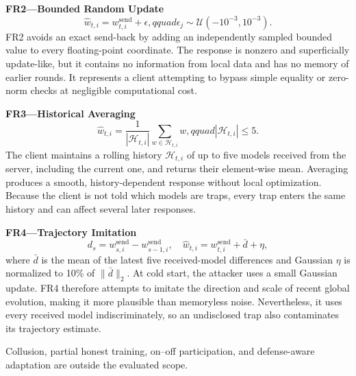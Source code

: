 \documentclass[conference]{IEEEtran}
\begin{document}
\medskip\noindent\textbf{FR2---Bounded Random Update}
\begin{equation}
\widehat w_{t,i}=w^{\mathrm{send}}_{t,i}+\epsilon,qquad
\epsilon_j\sim\mathcal U(-10^{-3},10^{-3}).
\end{equation}
FR2 avoids an exact send-back by adding an independently sampled bounded value to every floating-point coordinate. The response is nonzero and superficially update-like, but it contains no information from local data and has no memory of earlier rounds. It represents a client attempting to bypass simple equality or zero-norm checks at negligible computational cost.

\medskip\noindent\textbf{FR3---Historical Averaging}
\begin{equation}
\widehat w_{t,i}=\frac{1}{|\mathcal H_{t,i}|}
\sum_{w\in\mathcal H_{t,i}}w,qquad |\mathcal H_{t,i}|\leq5.
\end{equation}
The client maintains a rolling history $\mathcal H_{t,i}$ of up to five models received from the server, including the current one, and returns their element-wise mean. Averaging produces a smooth, history-dependent response without local optimization. Because the client is not told which models are traps, every trap enters the same history and can affect several later responses.

\medskip\noindent\textbf{FR4---Trajectory Imitation}
\begin{equation}
d_s=w^{\mathrm{send}}_{s,i}-w^{\mathrm{send}}_{s-1,i},\quad
\widehat w_{t,i}=w^{\mathrm{send}}_{t,i}+\bar d+\eta,
\end{equation}
where $\bar d$ is the mean of the latest five received-model differences and Gaussian $\eta$ is normalized to 10\% of $\lVert\bar d\rVert_2$. At cold start, the attacker uses a small Gaussian update. FR4 therefore attempts to imitate the direction and scale of recent global evolution, making it more plausible than memoryless noise. Nevertheless, it uses every received model indiscriminately, so an undisclosed trap also contaminates its trajectory estimate.

Collusion, partial honest training, on--off participation, and defense-aware adaptation are outside the evaluated scope.
\end{document}
